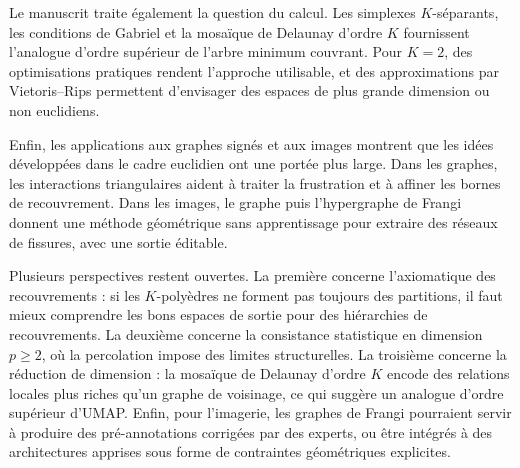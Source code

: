 Le manuscrit traite également la question du calcul. Les simplexes $K$-séparants, les conditions de Gabriel et la mosaïque de Delaunay d'ordre $K$ fournissent l'analogue d'ordre supérieur de l'arbre minimum couvrant. Pour $K=2$, des optimisations pratiques rendent l'approche utilisable, et des approximations par Vietoris--Rips permettent d'envisager des espaces de plus grande dimension ou non euclidiens.

Enfin, les applications aux graphes signés et aux images montrent que les idées développées dans le cadre euclidien ont une portée plus large. Dans les graphes, les interactions triangulaires aident à traiter la frustration et à affiner les bornes de recouvrement. Dans les images, le graphe puis l'hypergraphe de Frangi donnent une méthode géométrique sans apprentissage pour extraire des réseaux de fissures, avec une sortie éditable.

Plusieurs perspectives restent ouvertes. La première concerne l'axiomatique des recouvrements : si les $K$-polyèdres ne forment pas toujours des partitions, il faut mieux comprendre les bons espaces de sortie pour des hiérarchies de recouvrements. La deuxième concerne la consistance statistique en dimension $p\geq 2$, où la percolation impose des limites structurelles. La troisième concerne la réduction de dimension : la mosaïque de Delaunay d'ordre $K$ encode des relations locales plus riches qu'un graphe de voisinage, ce qui suggère un analogue d'ordre supérieur d'UMAP. Enfin, pour l'imagerie, les graphes de Frangi pourraient servir à produire des pré-annotations corrigées par des experts, ou être intégrés à des architectures apprises sous forme de contraintes géométriques explicites.

